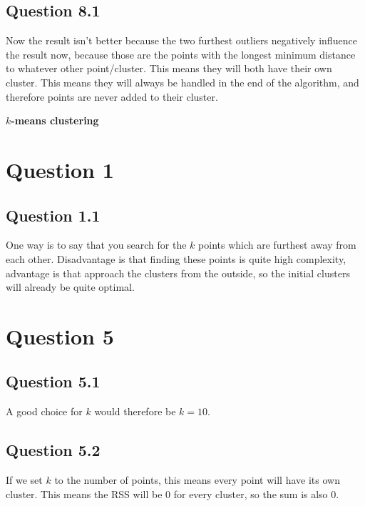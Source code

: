 \documentclass[11pt,twoside,a4paper]{article}
\begin{document}
	\subsection{Question 8.1}
	Now the result isn't better because the two furthest outliers negatively influence the result now, because those are the points with the longest minimum distance to whatever other point/cluster. This means they will both have their own cluster. This means they will always be handled in the end of the algorithm, and therefore points are never added to their cluster.

\textbf{$k$-means clustering}

\section{Question 1}

	\subsection{Question 1.1}
	One way is to say that you search for the $k$ points which are furthest away from each other. Disadvantage is that finding these points is quite high complexity, advantage is that approach the clusters from the outside, so the initial clusters will already be quite optimal.
	
\section{Question 5}

	\subsection{Question 5.1}
	A good choice for $k$ would therefore be $k = 10$.
	
	\subsection{Question 5.2}
	If we set $k$ to the number of points, this means every point will have its own cluster. This means the RSS will be 0 for every cluster, so the sum is also 0.	
	
\begin{thebibliography}{9}
\end{thebibliography}
\end{document}
